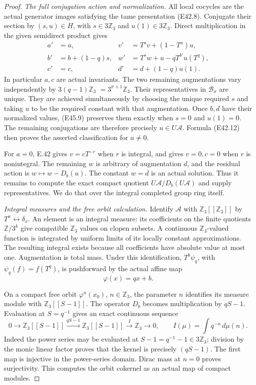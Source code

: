 \begin{proof}
\emph{The full conjugation action and normalization.}
All local cocycles are the actual generator
images satisfying the tame presentation
(E42.8). Conjugate their section by
$(s,u)\in H$, with
$s\in3\mathbb Z_3$ and $u(1)\in3\mathbb Z_3$.
Direct multiplication in the given
semidirect product gives
\[
\begin{aligned}
 a'&=a,&
 v'&=T^sv+(1-T^a)u,\\
 b'&=b+(1-q)s,&
 w'&=T^sw+u-qT^{b'}u(T^q),\\
 c'&=c,&d'&=d+(1-q)u(1).
\end{aligned}
 \tag{E45.9}
\]
In particular $a,c$ are actual invariants.
The two remaining augmentations vary
independently by $3(q-1)\mathbb Z_3$
$=3^{\sigma+1}\mathbb Z_3$.
Their representatives in
$\mathcal B_\sigma$ are unique. They
are achieved simultaneously by choosing
the unique required $s$ and taking $u$
to be the required constant with that
augmentation. Once $b,d$ have their
normalized values, (E45.9) preserves
them exactly when $s=0$ and $u(1)=0$.
The remaining conjugations are therefore
precisely $u\in U\mathscr A$. Formula
(E42.12) then proves the asserted
classification for $a\ne0$.

For $a=0$, E.42 gives $v=cT^{-r}$
when $r$ is integral, and gives
$v=0,c=0$ when $r$ is nonintegral.
The remaining $w$ is arbitrary of
augmentation $d$, and the residual
action is $w\mapsto w-D_b(u)$.
The constant $w=d$ is an actual
solution. Thus it remains to compute
the exact compact quotient
$U\mathscr A/D_b(U\mathscr A)$
and supply representatives. We do
that over the integral completed
group ring itself.

\emph{Integral measures and the free orbit calculation.}
Identify $\mathscr A$ with
$\mathbb Z_3[[\mathbb Z_3]]$ by
$T^x\leftrightarrow\delta_x$.
An element is an integral measure:
its coefficients on the finite
quotients $\mathbb Z/3^k$ give
compatible $\mathbb Z_3$ values
on clopen subsets. A continuous
$\mathbb Z_3$-valued function is
integrated by uniform limits of
its locally constant approximations.
The resulting integral exists
because all coefficients have
absolute value at most one.
Augmentation is total mass.
Under this identification,
$T^b\psi_q$, with
$\psi_q(f)=f(T^q)$, is pushforward
by the actual affine map
\[
                 \varphi(x)=qx+b.
 \tag{E45.10}
\]

On a compact free orbit
$\varphi^n(x_0)$, $n\in\mathbb Z_3$,
the parameter $n$ identifies its
measure module with
$\mathbb Z_3[[S-1]]$.
The operator $D_b$ becomes
multiplication by $qS-1$.
Evaluation at $S=q^{-1}$ gives
an exact continuous sequence
\[
 0\longrightarrow\mathbb Z_3[[S-1]]
   \xrightarrow{qS-1}\mathbb Z_3[[S-1]]
   \xrightarrow{I}\mathbb Z_3\longrightarrow0,
 \qquad
 I(\mu)=\int q^{-n}\,d\mu(n).
 \tag{E45.11}
\]
Indeed the power series may be
evaluated at $S-1=q^{-1}-1\in3\mathbb Z_3$;
division by the monic linear
factor proves that the kernel
is precisely $(qS-1)$. The
first map is injective in the
power-series domain. Dirac
mass at $n=0$ proves
surjectivity. This computes
the orbit cokernel as an
actual map of compact modules.


\end{proof}
